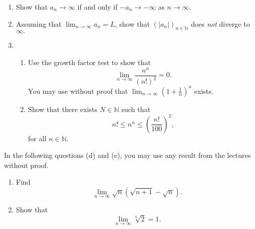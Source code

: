 \documentclass[
  12pt,
  a4paper]{extarticle}
\providecommand{\tightlist}{%
  \setlength{\itemsep}{0pt}\setlength{\parskip}{0pt}}
\theoremstyle{plain}
\theoremstyle{definition}
\theoremstyle{plain}
\theoremstyle{plain}
\theoremstyle{plain}
\theoremstyle{plain}
\theoremstyle{definition}
\theoremstyle{definition}
\newtheorem*{Order Axioms*}{Order Axioms}\newtheorem{Order Axioms}{Order Axioms}[section]
\theoremstyle{remark}
\theoremstyle{remark}
\renewcommand{\;}{\,}
\begin{document}
\begin{enumerate}
\def\labelenumi{\alph{enumi})}
\item
  Show that \(a_n \to \infty\) if and only if \(-a_n \to -\infty\) as \(n \to \infty\).
\item
  Assuming that \(\lim_{n\to\infty}a_n = L\), show that \(\left(\lvert a_n \rvert\right)_{n\in\mathbb{N}}\) does \emph{not} diverge to \(\infty.\)
\item
  \begin{enumerate}
  \def\labelenumii{\roman{enumii})}
  \tightlist
  \item
    Use the growth factor test to show that \[\lim_{n\to\infty}\frac{n^n}{(n!)^2} = 0.\] You may use without proof that \(\lim_{n\to\infty}\left(1 + \frac{1}{n}\right)^n\) exists.
  \item
    Show that there exists \(N \in \mathbb{N}\) such that \[n! \leq n^n \leq \left(\frac{n!}{100}\right)^2,\] for all \(n \in \mathbb{N}\).
  \end{enumerate}
\end{enumerate}

In the following questions (d) and (e), you may use any result from the lectures without proof.

\begin{enumerate}
\def\labelenumi{\alph{enumi})}
\setcounter{enumi}{3}
\tightlist
\item
  Find \[\lim_{n\to\infty}\sqrt{n}(\sqrt{n+1} - \sqrt{n}).\]
\item
  Show that \[\lim_{n\to\infty} \sqrt[n]{2} = 1.\]
\end{enumerate}
\end{document}

